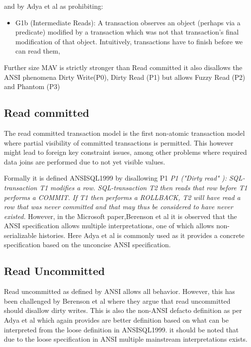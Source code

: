 \documentclass[a4paper,10pt,titlepage]{report}
\begin{document}
    and by Adya et al\cite{Adya99weakconsistency:} as prohibiting:
    \begin{itemize}
        \item G1b (Intermediate Reads): A transaction observes an object (perhaps via a predicate) modified by a transaction which was not that transaction's final modification of that object. Intuitively, transactions have to finish before we can read them,
    \end{itemize}

    Further size MAV is strictly stronger than Read committed it also disallows the ANSI phenomena Dirty Write(P0), Dirty Read (P1) but allows Fuzzy Read (P2) and Phantom (P3)

    \subsection{Read committed}
    The read committed transaction model is the first non-atomic transaction model where partial visibility of committed transactions is permitted. This however might lead to foreign key constraint issues, among other problems where required data joins are performed due to not yet visible values.


    Formally it is defined ANSISQL1999\cite{ansisql1999} by disallowing P1
\textit{P1 ("Dirty read" ): SQL-transaction T1 modifies a row. SQL-transaction T2 then reads that row before T1 performs a COMMIT. If T1 then performs a ROLLBACK, T2 will have read a row that was never committed and that may thus be considered to have never existed.} However, in the Microsoft paper,Berenson et al \cite{Berensonetal} it is observed that the ANSI specification allows multiple interpretations, one of which allows non-serializable histories. Here Adya et al\cite{Adya99weakconsistency:} is commonly used as it provides a concrete specification based on the unconcise ANSI specification. 



    \subsection{Read Uncommitted}
    Read uncommitted as defined by ANSI allows all behavior. However, this has been challenged by Berenson et al\cite{Berensonetal} where they argue that read uncommitted should disallow dirty writes. This is also the non-ANSI defacto definition as per Adya et al \cite{Adya99weakconsistency:} which again provides are better definition based on what can be interpreted from the loose definition in ANSISQL1999\cite{ansisql1999}. it should be noted that due to the loose specification in ANSI multiple mainstream interpretations exists.\\
\end{document}
